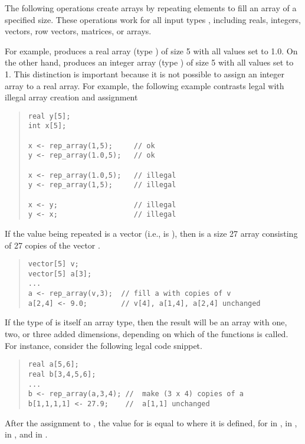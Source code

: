 The following operations create arrays by repeating elements to fill
an array of a specified size.  These operations work for all input
types , including reals, integers, vectors, row vectors,
matrices, or arrays.
%
\begin{description}
%
%
\end{description}
%
For example,  produces a real array (type
) of size 5 with all values set to 1.0.  On the other
hand,  produces an integer array (type
) of size 5 with all values set to 1.  This distinction is
important because it is not possible to assign an integer array to a
real array.  For example, the following example contrasts legal with
illegal array creation and assignment
%
\begin{quote}
\begin{Verbatim}[fontsize=\small]
real y[5];
int x[5];

x <- rep_array(1,5);     // ok
y <- rep_array(1.0,5);   // ok

x <- rep_array(1.0,5);   // illegal 
y <- rep_array(1,5);     // illegal

x <- y;                  // illegal
y <- x;                  // illegal
\end{Verbatim}
\end{quote}

If the value being repeated  is a vector (i.e.,  is
), then  is a size 27 array
consisting of 27 copies of the vector .
%
\begin{quote}
\begin{Verbatim}[fontsize=\small]
vector[5] v;
vector[5] a[3];
...
a <- rep_array(v,3);  // fill a with copies of v
a[2,4] <- 9.0;        // v[4], a[1,4], a[2,4] unchanged
\end{Verbatim}
\end{quote}

If the type  of  is itself an array type, then the
result will be an array with one, two, or three added dimensions,
depending on which of the  functions is called.  For
instance, consider the following legal code snippet.
%
\begin{quote}
\begin{Verbatim}[fontsize=\small]
real a[5,6];
real b[3,4,5,6];
...
b <- rep_array(a,3,4); //  make (3 x 4) copies of a
b[1,1,1,1] <- 27.9;    //  a[1,1] unchanged
\end{Verbatim}
\end{quote}
%
After the assignment to , the value for  is
equal to  where it is defined, for  in ,
 in ,  in , and  in
.

